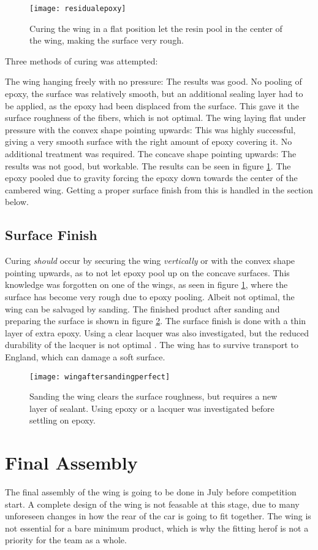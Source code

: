     \begin{figure}
      \texttt{[image: residualepoxy]}
      \caption{Curing the wing in a flat position let the resin pool in the center of the wing, making the surface very rough.}
      \label{fig:roughsurface}
    \end{figure}

    Three methods of curing was attempted:

    The wing hanging freely with no pressure: The results was good. No pooling of epoxy, the surface was relatively smooth, but an additional sealing layer had to be applied, as the epoxy had been displaced from the surface. This gave it the surface roughness of the fibers, which is not optimal.
    The wing laying flat under pressure with the convex shape pointing upwards: This was highly successful, giving a very smooth surface with the right amount of epoxy covering it. No additional treatment was required.
    The concave shape pointing upwards: The results was not good, but workable. The results can be seen in figure \ref{fig:roughsurface}. The epoxy pooled due to gravity forcing the epoxy down towards the center of the cambered wing. Getting a proper surface finish from this is handled in the section below.

  \subsection{Surface Finish}

    Curing \emph{should} occur by securing the wing \emph{vertically} or with the convex shape pointing upwards, as to not let epoxy pool up on the concave surfaces. This knowledge was forgotten on one of the wings, as seen in figure \ref{fig:roughsurface}, where the surface has become very rough due to epoxy pooling. Albeit not optimal, the wing can be salvaged by sanding. The finished product after sanding and preparing the surface is shown in figure \ref{fig:wingaftersanding}. The surface finish is done with a thin layer of extra epoxy. Using a clear lacquer was also investigated, but the reduced durability of the lacquer is not optimal \cite{lacquersucks}. The wing has to survive transport to England, which can damage a soft surface.

    \begin{figure}
      \texttt{[image: wingaftersandingperfect]}
      \caption{Sanding the wing clears the surface roughness, but requires a new layer of sealant. Using epoxy or a lacquer was investigated before settling on epoxy.}
      \label{fig:wingaftersanding}
    \end{figure}

  \section{Final Assembly}

    The final assembly of the wing is going to be done in July before competition start. A complete design of the wing is not feasable at this stage, due to many unforeseen changes in how the rear of the car is going to fit together. The wing is not essential for a bare minimum product, which is why the fitting herof is not a priority for the team as a whole.
